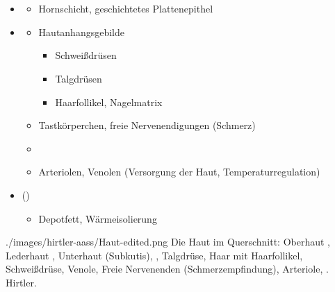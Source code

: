 \paragraph{}~
{

\begin{itemize}
    \item {}   
    \begin{itemize}
        \item Hornschicht, geschichtetes Plattenepithel
    \end{itemize}
    \item {} 
    \begin{itemize}
        \item Hautanhangsgebilde
        \begin{itemize}
            \item Schweißdrüsen
            \item Talgdrüsen
            \item Haarfollikel, Nagelmatrix
        \end{itemize}
        \item Tastkörperchen, freie Nervenendigungen (Schmerz)
        \item {}
        \item Arteriolen, Venolen (Versorgung der Haut, Temperaturregulation)
    \end{itemize}
    \item {} ()  
    \begin{itemize}
        \item Depotfett, Wärmeisolierung
    \end{itemize}
\end{itemize}
}{}
{./images/hirtler-aass/Haut-edited.png}
{Die Haut im Querschnitt:  Oberhaut ,
 Lederhaut ,
 Unterhaut (Subkutis),
 ,
 Talgdrüse,
 Haar mit Haarfollikel,
 Schweißdrüse,
 Venole,
 Freie Nervenenden (Schmerzempfindung),
 Arteriole,
 .
}
{Hirtler.}




